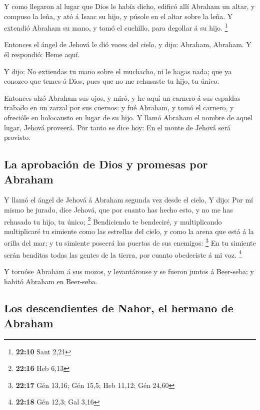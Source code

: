  Y como llegaron al lugar que Dios le había dicho, edificó
allí Abraham un altar, y compuso la leña, y ató á Isaac su hijo, y
púsole en el altar sobre la leña.  Y extendió Abraham su
mano, y tomó el cuchillo, para degollar á su hijo. \footnote{\textbf{22:10}
  Sant 2,21}

 Entonces el ángel de Jehová le dió voces del cielo, y
dijo: Abraham, Abraham. Y él respondió: Heme aquí.

 Y dijo: No extiendas tu mano sobre el muchacho, ni le
hagas nada; que ya conozco que temes á Dios, pues que no me rehusaste tu
hijo, tu único.

 Entonces alzó Abraham sus ojos, y miró, y he aquí un
carnero á sus espaldas trabado en un zarzal por sus cuernos: y fué
Abraham, y tomó el carnero, y ofrecióle en holocausto en lugar de su
hijo.  Y llamó Abraham el nombre de aquel lugar, Jehová
proveerá. Por tanto se dice hoy: En el monte de Jehová será provisto.

\hypertarget{la-aprobaciuxf3n-de-dios-y-promesas-por-abraham}{%
\subsection{La aprobación de Dios y promesas por
Abraham}\label{la-aprobaciuxf3n-de-dios-y-promesas-por-abraham}}

 Y llamó el ángel de Jehová á Abraham segunda vez desde
el cielo,  Y dijo: Por mí mismo he jurado, dice Jehová,
que por cuanto has hecho esto, y no me has rehusado tu hijo, tu único;
\footnote{\textbf{22:16} Heb 6,13}  Bendiciendo te
bendeciré, y multiplicando multiplicaré tu simiente como las estrellas
del cielo, y como la arena que está á la orilla del mar; y tu simiente
poseerá las puertas de sus enemigos: \footnote{\textbf{22:17} Gén 13,16;
  Gén 15,5; Heb 11,12; Gén 24,60}  En tu simiente serán
benditas todas las gentes de la tierra, por cuanto obedeciste á mi voz.
\footnote{\textbf{22:18} Gén 12,3; Gal 3,16}

 Y tornóse Abraham á sus mozos, y levantáronse y se
fueron juntos á Beer-seba; y habitó Abraham en Beer-seba.

\hypertarget{los-descendientes-de-nahor-el-hermano-de-abraham}{%
\subsection{Los descendientes de Nahor, el hermano de
Abraham}\label{los-descendientes-de-nahor-el-hermano-de-abraham}}


